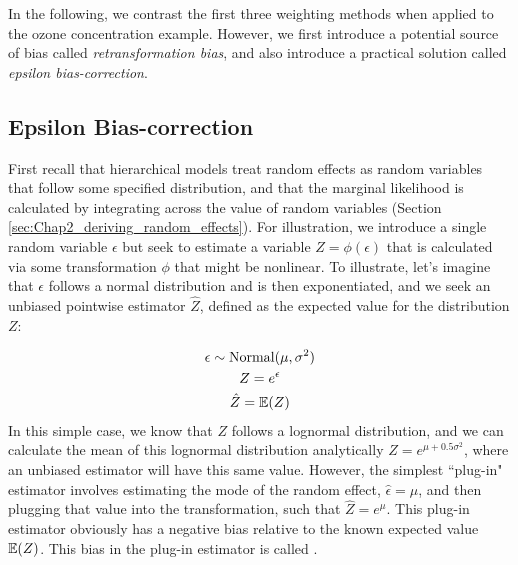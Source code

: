 In the following, we contrast the first three weighting methods when applied to the ozone concentration example.  However, we first introduce a potential source of bias called \textit{retransformation bias}, and also introduce a practical solution called \textit{epsilon bias-correction}.

\subsection{Epsilon Bias-correction}

First recall that hierarchical models treat random effects as random variables that follow some specified distribution, and that the marginal likelihood is calculated by integrating across the value of random variables (Section \ref{sec:Chap2_deriving_random_effects}).  For illustration, we introduce a single random variable \(\epsilon\) but seek to estimate a variable \( Z = \phi(\epsilon) \) that is calculated via some transformation \(\phi\) that might be nonlinear.  To illustrate, let's imagine that \(\epsilon\) follows a normal distribution and is then exponentiated, and we seek an unbiased pointwise estimator \(\hat Z\), defined as the expected value for the distribution \(Z\):

\begin{equation}
\begin{gathered}
    \epsilon \sim \mathrm{Normal} (\mu, \sigma^2) \\
    Z = e^{\epsilon} \\
    \hat Z = \operatorname{\mathbb{E}}(Z)
\end{gathered}
\end{equation}
In this simple case, we know that \( Z \) follows a lognormal distribution, and we can calculate the mean of this lognormal distribution analytically \( \hat Z = e^{\mu + 0.5\sigma^2} \), where an unbiased estimator will have this same value. However, the simplest ``plug-in" estimator involves estimating the mode of the random effect, \( \hat \epsilon = \mu \), and then plugging that value into the transformation, such that \( \hat Z = e^{\mu} \).  This plug-in estimator obviously has a negative bias relative to the known expected value \(\operatorname{\mathbb{E}}(Z)\).  This bias in the plug-in estimator is called .  

